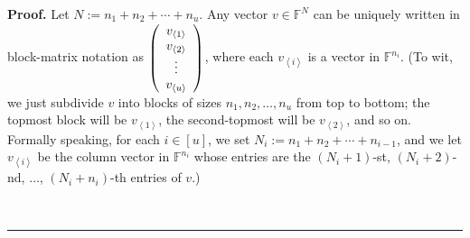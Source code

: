 \documentclass[numbers=enddot,12pt,final,onecolumn,notitlepage]{scrartcl}%
\numberwithin{exer}{subsection}
\theoremstyle{definition}
\newenvironment{proof}[1][Proof]{\noindent\textbf{#1.} }{\ \rule{0.5em}{0.5em}}
\begin{document}
\begin{proof}
Let $N:=n_{1}+n_{2}+\cdots+n_{u}$. Any vector $v\in\mathbb{F}^{N}$ can be
uniquely written in block-matrix notation as $\left(
\begin{array}
[c]{c}%
v_{\left\langle 1\right\rangle }\\
v_{\left\langle 2\right\rangle }\\
\vdots\\
v_{\left\langle u\right\rangle }%
\end{array}
\right)  $, where each $v_{\left\langle i\right\rangle }$ is a vector in
$\mathbb{F}^{n_{i}}$. (To wit, we just subdivide $v$ into blocks of sizes
$n_{1},n_{2},\ldots,n_{u}$ from top to bottom; the topmost block will be
$v_{\left\langle 1\right\rangle }$, the second-topmost will be
$v_{\left\langle 2\right\rangle }$, and so on. Formally speaking, for each
$i\in\left[  u\right]  $, we set $N_{i}:=n_{1}+n_{2}+\cdots+n_{i-1}$, and we
let $v_{\left\langle i\right\rangle }$ be the column vector in $\mathbb{F}%
^{n_{i}}$ whose entries are the $\left(  N_{i}+1\right)  $-st, $\left(
N_{i}+2\right)  $-nd, $\ldots$, $\left(  N_{i}+n_{i}\right)  $-th entries of
$v$.)


\end{proof}
\end{document}
